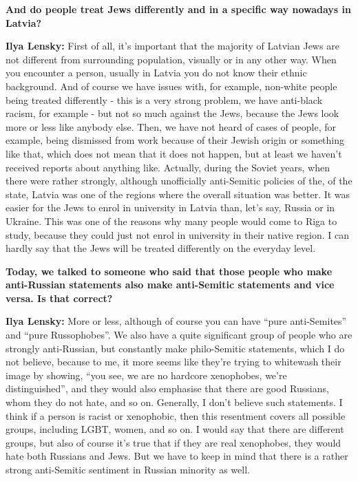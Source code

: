 \textbf{And do people treat Jews differently and in a specific way nowadays in Latvia?} 

\textbf{Ilya Lensky:} First of all, it's important that the majority of Latvian Jews are not different from surrounding population, visually or in any other way. When you encounter a person, usually in Latvia you do not know their ethnic background. And of course we have issues with, for example, non-white people being treated differently - this is a very strong problem, we have anti-black racism, for example - but not so much against the Jews, because the Jews look more or less like anybody else. Then, we have not heard of cases of people, for example, being dismissed from work because of their Jewish origin or something like that, which does not mean that it does not happen, but at least we haven't received reports about anything like. Actually, during the Soviet years, when there were rather strongly, although unofficially anti-Semitic policies of the, of the state, Latvia was one of the regions where the overall situation was better. It was easier for the Jews to enrol in university in Latvia than, let’s say, Russia or in Ukraine. This was one of the reasons why many people would come to Riga to study, because they could just not enrol in university in their native region. I can hardly say that the Jews will be treated differently on the everyday level. 

\textbf{Today, we talked to someone who said that those people who make anti-Russian statements also make anti-Semitic statements and vice versa. Is that correct?}

\textbf{Ilya Lensky:} More or less, although of course you can have ``pure anti-Semites'' and ``pure Russophobes''. We also have a quite significant group of people who are strongly anti-Russian, but constantly make philo-Semitic statements, which I do not believe, because to me, it more seems like they’re trying to whitewash their image by showing, ``you see, we are no hardcore xenophobes, we’re distinguished'', and they would also emphasise that there are good Russians, whom they do not hate, and so on. Generally, I don’t believe such statements. I think if a person is racist or xenophobic, then this resentment covers all possible groups, including LGBT, women, and so on. I would say that there are different groups, but also of course it’s true that if they are real xenophobes, they would hate both Russians and Jews. But we have to keep in mind that there is a rather strong anti-Semitic sentiment in Russian minority as well. 

